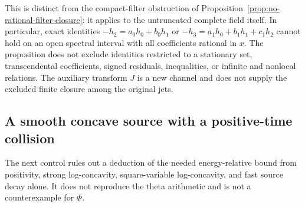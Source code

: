 \documentclass[11pt]{article}
\numberwithin{equation}{section}
\theoremstyle{definition}
\theoremstyle{remark}
\begin{document}
This is distinct from the compact-filter obstruction of
Proposition~\ref{prop:no-rational-filter-closure}: it applies to the
untruncated complete field itself. In particular, exact identities
\(-h_2=a_0h_0+b_0h_1\) or
\(-h_3=a_1h_0+b_1h_1+c_1h_2\) cannot hold on an open spectral
interval with all coefficients rational in \(x\). The proposition
does not exclude identities restricted to a stationary set,
transcendental coefficients, signed residuals, inequalities, or
infinite and nonlocal relations. The auxiliary transform \(J\)
is a new channel and does not supply the excluded finite closure
among the original jets.

\subsection{A smooth concave source with a positive-time collision}
\label{pp:collision-section}

The next control rules out a deduction of the needed energy-relative
bound from positivity, strong log-concavity, square-variable
log-concavity, and fast source decay alone. It does not reproduce
the theta arithmetic and is not a counterexample for \(\Phi\).
\end{document}
